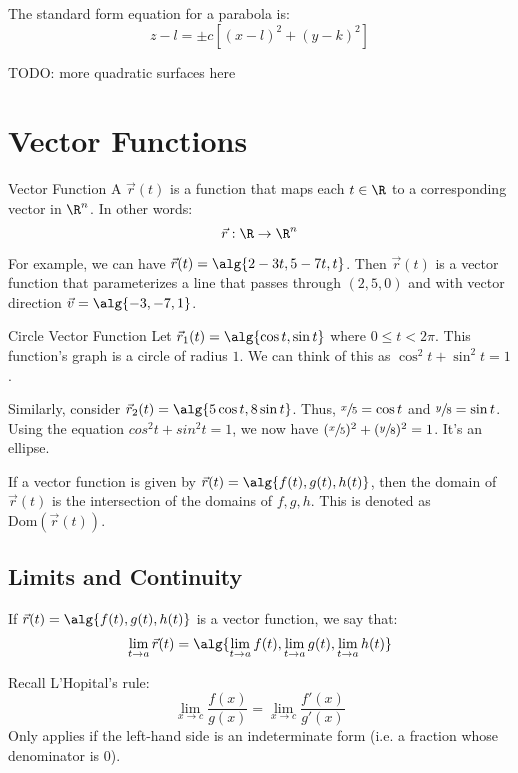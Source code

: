 \documentclass[12pt]{report}
\begin{document}
The standard form equation for a parabola is:
\[ z - l = \pm c \left[ (x-l)^2 + (y-k)^2 \right] \]

TODO: more quadratic surfaces here

\chapter{Vector Functions}

\begin{dfnbox}{Vector Function}{}
    A  $\vec{r}(t)$ is a function that maps each $t \in \R$ to a corresponding vector in $\R^n$. In other words:
    \[ \vec{r} : \R \to \R^n \]
\end{dfnbox}

For example, we can have $\vec{r}(t) = \alg{2-3t, 5-7t, t}$. Then $\vec{r}(t)$ is a vector function that parameterizes a line that passes through $(2,5,0)$ and with vector direction $\vec{v} = \alg{-3, -7, 1}$.

\begin{exbox}{Circle Vector Function}{}
    Let $\vec{r}_1(t) = \alg{ \cos t, \sin t}$ where $0 \leq t < 2\pi$. This function's graph is a circle of radius $1$. We can think of this as $\cos^2 t + \sin^2 t = 1$.

    Similarly, consider $\vec{r}_2(t) = \alg{ 5 \cos t, 8 \sin t }$. Thus, $\sfrac{x}{5} = \cos t$ and $\sfrac{y}{8} = \sin{t}$. Using the equation $cos^2 t + sin^2 t = 1$, we now have $(\sfrac{x}{5})^2 + (\sfrac{y}{8})^2 = 1$. It's an ellipse.
\end{exbox}

If a vector function is given by $\vec{r}(t) = \alg{f(t), g(t), h(t)}$, then the domain of $\vec{r}(t)$ is the intersection of the domains of $f,g,h$. This is denoted as $\text{Dom}(\vec{r}(t))$.

\section{Limits and Continuity}
If $\vec{r}(t) = \alg{f(t), g(t), h(t)}$ is a vector function, we say that:
\[ \lim_{t \to a} \vec{r}(t) = \alg{ \lim_{t \to a} f(t), \lim_{t \to a} g(t), \lim_{t \to a} h(t) } \]

\begin{notebox}
    Recall L'Hopital's rule:
    \[ \lim_{x \to c} \frac{f(x)}{g(x)} = \lim_{x \to c} \frac{f\prime(x)}{g\prime(x)} \]
    Only applies if the left-hand side is an indeterminate form (i.e. a fraction whose denominator is $0$).
\end{notebox}
\end{document}
